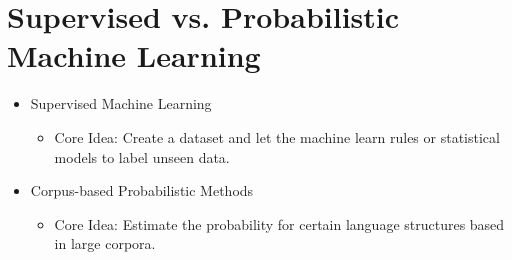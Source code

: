 \documentclass[a4paper, 11pt, accentcolor = tud3b]{tudreport}
\begin{document}
        \section{Supervised vs. Probabilistic Machine Learning} %
            \begin{itemize}
            	\item Supervised Machine Learning
            		\begin{itemize}
            			\item Core Idea: Create a dataset and let the machine learn rules or statistical models to label unseen data.
            		\end{itemize}
            	\item Corpus-based Probabilistic Methods
            		\begin{itemize}
            			\item Core Idea: Estimate the probability for certain language structures based in large corpora.
            		\end{itemize}
            \end{itemize}
\end{document}
